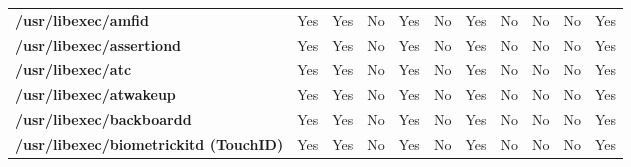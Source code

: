 \begin{center}
{\begin{tabular}{|>{\bfseries} l | C | C | C | C | C | C | C | C | C | C |}
					/usr/libexec/amfid & Yes & Yes & \color{green}No & \color{red}Yes & \color{green}No & \color{red}Yes & No & No & \color{green}No & \color{red}Yes\\ 
					/usr/libexec/assertiond & Yes & Yes & \color{green}No & \color{red}Yes & \color{green}No & \color{red}Yes & No & No & \color{green}No & \color{red}Yes\\ 
					/usr/libexec/atc & Yes & Yes & \color{green}No & \color{red}Yes & \color{green}No & \color{red}Yes & No & No & \color{green}No & \color{red}Yes\\ 
					/usr/libexec/atwakeup & Yes & Yes & \color{green}No & \color{red}Yes & \color{green}No & \color{red}Yes & No & No & \color{green}No & \color{red}Yes\\ 
					/usr/libexec/backboardd & Yes & Yes & \color{green}No & \color{red}Yes & \color{green}No & \color{red}Yes & No & No & \color{green}No & \color{red}Yes\\ 
					/usr/libexec/biometrickitd (TouchID) & Yes & Yes & \color{green}No & \color{red}Yes & \color{green}No & \color{red}Yes & No & No & \color{green}No & \color{red}Yes\\ 

			\end{tabular}
		}
	\end{center}



